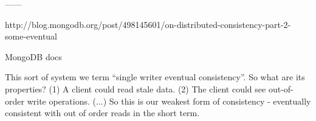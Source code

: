 \documentclass[11pt,a4paper,ngerman]{scrartcl}
\begin{document}
------

http://blog.mongodb.org/post/498145601/on-distributed-consistency-part-2-some-eventual

MongoDB docs

This sort of system we term “single writer eventual consistency”.  So what are its properties?  (1) A client could read stale data. (2) The client could see out-of-order write operations. (...) So this is our weakest form of consistency - eventually consistent with out of order reads in the short term. 
 

\pagebreak
\printglossaries
\end{document}
